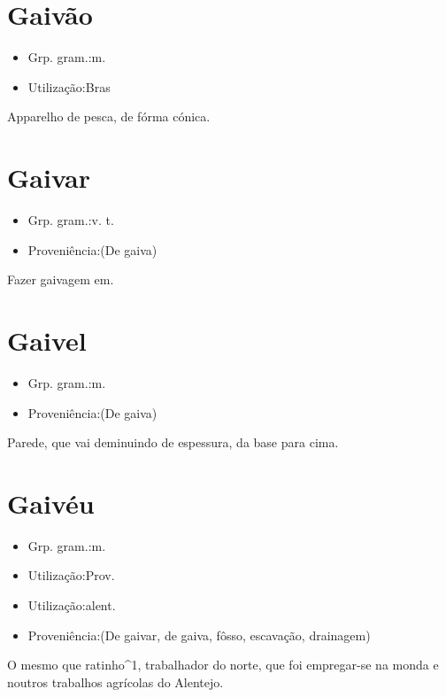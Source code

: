 \section{Gaivão}
\begin{itemize}
\item {Grp. gram.:m.}
\end{itemize}
\begin{itemize}
\item {Utilização:Bras}
\end{itemize}
Apparelho de pesca, de fórma cónica.
\section{Gaivar}
\begin{itemize}
\item {Grp. gram.:v. t.}
\end{itemize}
\begin{itemize}
\item {Proveniência:(De \textunderscore gaiva\textunderscore )}
\end{itemize}
Fazer gaivagem em.
\section{Gaivel}
\begin{itemize}
\item {Grp. gram.:m.}
\end{itemize}
\begin{itemize}
\item {Proveniência:(De \textunderscore gaiva\textunderscore )}
\end{itemize}
Parede, que vai deminuindo de espessura, da base para cima.
\section{Gaivéu}
\begin{itemize}
\item {Grp. gram.:m.}
\end{itemize}
\begin{itemize}
\item {Utilização:Prov.}
\end{itemize}
\begin{itemize}
\item {Utilização:alent.}
\end{itemize}
\begin{itemize}
\item {Proveniência:(De \textunderscore gaivar\textunderscore , de \textunderscore gaiva\textunderscore , fôsso, escavação, drainagem)}
\end{itemize}
O mesmo que \textunderscore ratinho\textunderscore ^1, trabalhador do norte, que foi empregar-se na monda e noutros trabalhos agrícolas do Alentejo.
